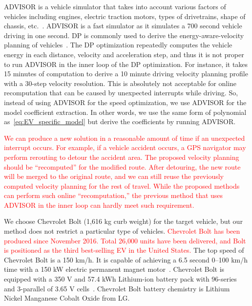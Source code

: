\documentclass{IEEEtran}
\begin{document}
ADVISOR is a vehicle simulator that takes into account various factors of vehicles including engines, electric traction motors, types of drivetrains, shape of chassis, etc.~\cite{Markel:JPS02}. ADVISOR is a fast simulator as it simulates a 700 second vehicle driving in one second. DP is commonly used to derive the energy-aware-velocity planning of vehicles~\cite{Lin:ICCA14,Dib:IVPPC11}. The DP optimization repeatedly computes the vehicle energy in each distance, velocity and acceleration step, and thus it is not proper to run ADVISOR in the inner loop of the DP optimization. For instance, it takes 15 minutes of computation to derive a 10 minute driving velocity planning profile with a 30-step velocity resolution. This is absolutely not acceptable for online recomputation that can be caused by unexpected interrupts while driving. So, instead of using ADVISOR for the speed optimization, we use ADVISOR for the model coefficient extraction. In other words, we use the same form of polynomial as~\eqref{eq:EV_specific_model} but derive the coefficients by running ADVISOR. 

\textcolor{red}{We can produce a new solution in a reasonable amount of time if an unexpected interrupt occurs. For example, if a vehicle accident occurs, a GPS navigator may perform rerouting to detour the accident area. The proposed velocity planning should be ``recomputed'' for the modified route. After detouring, the new route will be merged to the original route, and we can still reuse the previously computed  velocity planning for the rest of travel. While the proposed methods can perform such online ``recomputation,'' the previous method that uses ADVISOR in the inner loop can hardly meet such requirement.}

We choose Chevrolet Bolt (1,616 kg curb weight) for the target vehicle, but our method does not restrict a particular type of vehicles. \textcolor{red}{Chevrolet Bolt has been produced since November 2016. Total 26,000 units have been  delivered, and Bolt is positioned as the third best-selling EV in the United States.} The top speed of Chevrolet Bolt is a 150 km/h. It is capable of achieving a 6.5 second 0--100 km/h time with a 150 kW electric permanent magnet motor~\cite{GM_Bolt:official}. Chevrolet Bolt is equipped with a 350 V and 57.4 kWh Lithium-ion battery pack with 96-series and 3-parallel of 3.65 V cells~\cite{GM_Bolt:spec}. Chevrolet Bolt battery chemistry is Lithium Nickel Manganese Cobalt Oxide from LG. 
\end{document}
